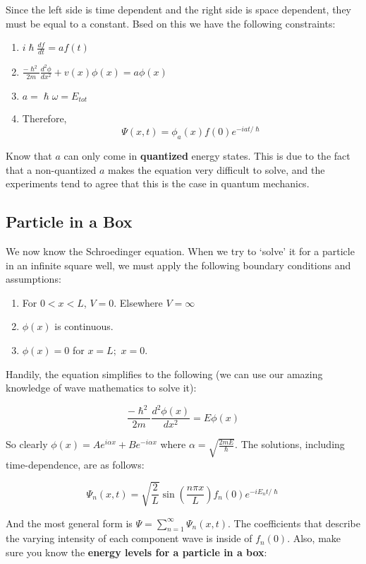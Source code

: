 \documentclass[a4paper,12pt]{report}
\begin{document}
Since the left side is time dependent and the right side is space dependent, they must be equal to a constant. Bsed on this we have the following constraints:
\begin{enumerate}
\item $i \hslash \frac{df}{dt} = af(t)$
\item $\frac{-\hslash^2}{2m} \frac{d^2 \phi}{dx^2} + v(x)\phi(x) = a\phi(x)$
\item $a = \hslash \omega = E_{tot}$
\item Therefore, $$\Psi(x, t) = \phi_a(x) f(0)e^{-iat/\hslash}$$
\end{enumerate}

Know that $a$ can only come in \textbf{quantized} energy states. This is due to the fact that a non-quantized $a$ makes the equation very difficult to solve, and the experiments tend to agree that this is the case in quantum mechanics. 


\subsection{Particle in a Box}
We now know the Schroedinger equation. When we try to `solve' it for a particle in an infinite square well, we must apply the following boundary conditions and assumptions:
\begin{enumerate}
\item For $0 < x < L$, $V = 0$. Elsewhere $V = \infty$ 
\item $\phi(x)$ is continuous.
\item $\phi(x) = 0$ for $x = L;\,\, x=0$.
\end{enumerate}

Handily, the equation simplifies to the following (we can use our amazing knowledge of wave mathematics to solve it): 

$$\frac{-\hslash^2}{2m}\frac{d^2\phi(x)}{dx^2} = E\phi(x)$$

So clearly $\phi(x) = A e^{i\alpha x} + B e^{-i\alpha x}$ where $\alpha = \sqrt{\frac{2mE}{\hslash}}$. The solutions, including time-dependence, are as follows:

$$\Psi_n(x, t) = \sqrt{\frac{2}{L}} \sin(\frac{n\pi x}{L}) f_n(0) e^{-i E_n t/\hslash}$$

And the most general form is $\Psi = \sum_{n=1}^{\infty} \Psi_n(x, t)$. The coefficients that describe the varying intensity of each component wave is inside of $f_n(0)$. Also, make sure you know the \textbf{energy levels for a particle in a box}: 
\end{document}
